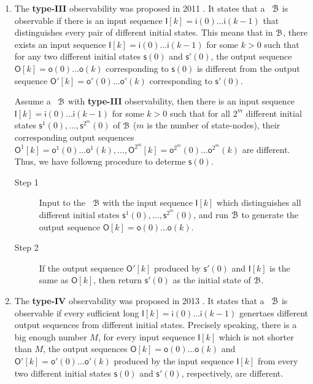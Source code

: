 \begin{enumerate}
\item The  {\bf type-III} observability was proposed in 2011 \cite{Cheng2011Identification}.  It states that a \BCN\ ${\mathcal{B}}$ is observable if there is an input sequence $\mathsf{I}[k]=\mathsf{i}(0)\ldots\mathsf{i}(k-1)$ that distinguishes every pair of different initial states. This means that in ${\mathcal{B}}$, there exists an input sequence  $\mathsf{I}[k]=\mathsf{i}(0)\ldots\mathsf{i}(k-1)$ for some $k>0$ such that for any two different initial states $\mathsf{s}(0)$ and $\mathsf{s}'(0)$, the output sequence $\mathsf{O}[k]=\mathsf{o}(0)\ldots\mathsf{o}(k)$  corresponding to  $\mathsf{s}(0)$  is different from the output sequence  $\mathsf{O}'[k]=\mathsf{o}'(0)\ldots\mathsf{o}'(k)$ corresponding to $\mathsf{s}'(0)$.

Assume a \BCN\ ${\mathcal{B}}$  with {\bf type-III}  observability, then there is an input sequence $\mathsf{I}[k]=\mathsf{i}(0)\ldots\mathsf{i}(k-1)$ for some $k>0$ such that for all ${2^m}$ different initial states $\mathsf{s}^1(0),\ldots, \mathsf{s}^{2^m}(0)$ of ${\mathcal{B}}$ ($m$ is the number of state-nodes), their corresponding output sequences $\mathsf{O}^1[k]=\mathsf{o}^1(0)\ldots\mathsf{o}^1(k),\ldots, \mathsf{O}^{2^m}[k]=\mathsf{o}^{2^m}(0)\ldots\mathsf{o}^{2^m}(k)$ are different. Thus, we have followng procedure to determe $\mathsf{s}(0)$.

 \begin{description}
	\item[Step 1]  Input to the \BCN\ ${\mathcal{B}}$ with the input sequence $\mathsf{I}[k]$ which distinguishes all different initial states $\mathsf{s}^1(0),\ldots, \mathsf{s}^{2^m}(0)$, and run ${\mathcal{B}}$ to generate the output sequence $\mathsf{O}[k]=\mathsf{o}(0)\ldots\mathsf{o}(k)$.
	\item[Step 2]  If the output sequence $\mathsf{O}'[k]$ produced by $\mathsf{s}'(0)$ and $\mathsf{I}[k]$ is the same as $\mathsf{O}[k]$, then return $\mathsf{s}'(0)$ as the initial state of ${\mathcal{B}}$.
\end{description}
	
\item  The  {\bf type-IV}  observability was  proposed in 2013 \cite{Fornasini2013Observability}. It states that a \BCN\ ${\mathcal{B}}$ is observable if every sufficient long $\mathsf{I}[k]=\mathsf{i}(0)\ldots\mathsf{i}(k-1)$ genertaes different output sequences  from different initial states. Precisely speaking, there is a big enough number $M$, for every  input sequence $\mathsf{I}[k]$ which is not shorter than $M$, the output sequences $\mathsf{O}[k]=\mathsf{o}(0) \ldots\mathsf{o}(k)$ and  $\mathsf{O}'[k]=\mathsf{o}'(0)\ldots\mathsf{o}'(k)$ produced by the input sequence $\mathsf{I}[k]$ from every two different initial states $\mathsf{s}(0)$ and $\mathsf{s}'(0)$, respectively, are different.


\end{enumerate}
